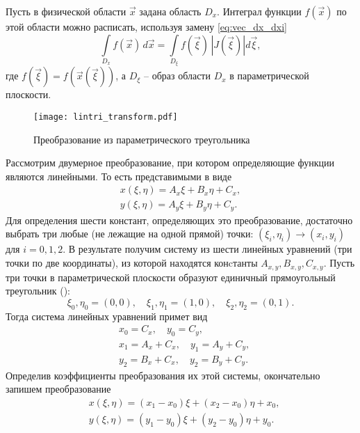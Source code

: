 Пусть в физической области $\vec x$ задана область $D_x$.
Интеграл функции $f(\vec x)$ по этой области
можно расписать, используя замену \cref{eq:vec_dx_dxi}
\begin{equation}
\label{eq:dxideta_integral}
\int\limits_{D_{x}}f(\vec x)\,d\vec x = \int\limits_{D_{\xi}}f(\vec \xi) \, |J(\vec \xi)|d\vec \xi,
\end{equation}
где $f(\vec \xi) = f(\vec x(\vec \xi))$, а $D_\xi$ -- образ области $D_x$ в параметрической плоскости.

\label{sec:lintri_transform}
\begin{figure}[h!]
\centering
\texttt{[image: lintri\_transform.pdf]}
\caption{Преобразование из параметрического треугольника}
\label{fig:lintri_transform}
\end{figure}
Рассмотрим двумерное преобразование, при котором
определяющие функции являются линейными. То есть представимыми в виде
\begin{align*}
x(\xi, \eta) = A_x \xi + B_x \eta + C_x, \\
y(\xi, \eta) = A_y \xi + B_y \eta + C_y.
\end{align*}
Для определения шести констант, определяющих это преобразование,
достаточно выбрать три любые (не лежащие на одной прямой) точки:
$(\xi_i, \eta_i) \to (x_i, y_i)$ для $i=0,1,2$.
В результате получим систему из шести линейных уравнений (три точки по две координаты),
из которой находятся конcтанты $A_{x,y}, B_{x,y}, C_{x,y}$.
Пусть три точки в параметрической плоскости
образуют единичный прямоугольный треугольник ():
\begin{equation*}
\xi_0, \eta_0 = (0, 0),\quad
\xi_1, \eta_1 = (1, 0),\quad
\xi_2, \eta_2 = (0, 1).
\end{equation*}
Тогда система линейных уравнений примет вид
\begin{align*}
&x_0 = C_x,       \quad y_0 = C_y, \\
&x_1 = A_x + C_x, \quad y_1 = A_y + C_y, \\
&y_2 = B_x + C_x, \quad y_2 = B_y + C_y.
\end{align*}
Определив коэффициенты преобразования их этой системы, окончательно запишем преобразование
\begin{equation}
\label{eq:lintri_transform}
\begin{aligned}
&x(\xi, \eta) = (x_1 - x_0)\xi + (x_2 - x_0) \eta + x_0,\\
&y(\xi, \eta) = (y_1 - y_0)\xi + (y_2 - y_0) \eta + y_0.\\
\end{aligned}
\end{equation}
